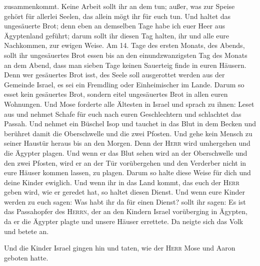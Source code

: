 zusammenkommt. Keine Arbeit sollt ihr an dem tun; außer, was zur Speise
gehört für allerlei Seelen, das allein mögt ihr für euch tun.
 Und haltet das ungesäuerte Brot; denn eben an demselben
Tage habe ich euer Heer aus Ägyptenland geführt; darum sollt ihr diesen
Tag halten, ihr und alle eure Nachkommen, zur ewigen Weise.
 Am 14. Tage des ersten Monats, des Abends, sollt ihr
ungesäuertes Brot essen bis an den einundzwanzigsten Tag des Monats an
dem Abend,  dass man sieben Tage keinen Sauerteig finde
in euren Häusern. Denn wer gesäuertes Brot isst, des Seele soll
ausgerottet werden aus der Gemeinde Israel, es sei ein Fremdling oder
Einheimischer im Lande.  Darum so esset kein gesäuertes
Brot, sondern eitel ungesäuertes Brot in allen euren Wohnungen.
 Und Mose forderte alle Ältesten in Israel und sprach zu
ihnen: Leset aus und nehmet Schafe für euch nach euren Geschlechtern und
schlachtet das Passah.  Und nehmet ein Büschel Isop und
tauchet in das Blut in dem Becken und berühret damit die Oberschwelle
und die zwei Pfosten. Und gehe kein Mensch zu seiner Haustür heraus bis
an den Morgen.  Denn der \textsc{Herr} wird umhergehen
und die Ägypter plagen. Und wenn er das Blut sehen wird an der
Oberschwelle und den zwei Pfosten, wird er an der Tür vorübergehen und
den Verderber nicht in eure Häuser kommen lassen, zu plagen.
 Darum so halte diese Weise für dich und deine Kinder
ewiglich.  Und wenn ihr in das Land kommt, das euch der
\textsc{Herr} geben wird, wie er geredet hat, so haltet diesen Dienst.
 Und wenn eure Kinder werden zu euch sagen: Was habt ihr
da für einen Dienst?  sollt ihr sagen: Es ist das
Passahopfer des \textsc{Herrn}, der an den Kindern Israel vorüberging in
Ägypten, da er die Ägypter plagte und unsere Häuser errettete. Da neigte
sich das Volk und betete an.

 Und die Kinder Israel gingen hin und taten, wie der
\textsc{Herr} Mose und Aaron geboten hatte.

